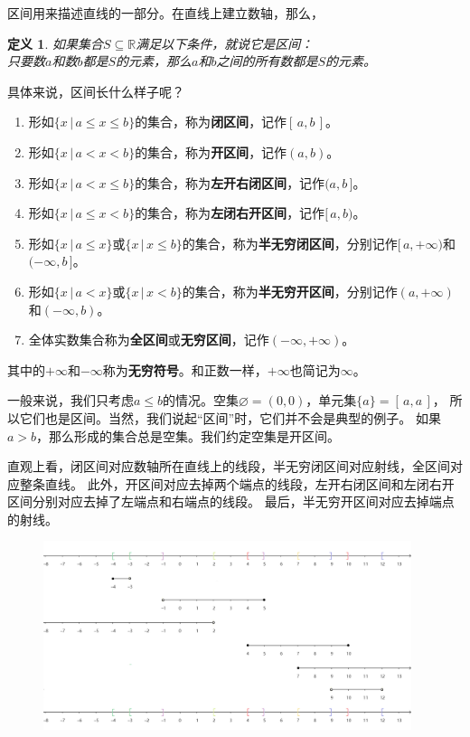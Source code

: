 \documentclass[12pt,UTF8]{ctexbook}
\newtheorem{df}{定义}[section]
\begin{document}
区间用来描述直线的一部分。在直线上建立数轴，那么，

\begin{df}\label{df:5-3-0}
    如果集合$S\subseteq \mathbb{R}$满足以下条件，就说它是区间：\\
    只要数$a$和数$b$都是$S$的元素，那么$a$和$b$之间的所有数都是$S$的元素。
\end{df}

具体来说，区间长什么样子呢？
\begin{enumerate}
    \item 形如$\{x \, | \, a \leqslant x \leqslant b\}$的集合，称为\textbf{闭区间}，记作$[\, a, b\,]$。
    \item 形如$\{x \, | \, a < x < b\}$的集合，称为\textbf{开区间}，记作$(a, b)$。
    \item 形如$\{x \, | \, a < x \leqslant b\}$的集合，称为\textbf{左开右闭区间}，记作$(a, b\,]$。
    \item 形如$\{x \, | \, a \leqslant x < b\}$的集合，称为\textbf{左闭右开区间}，记作$[\, a, b)$。
    \item 形如$\{x \, | \, a \leqslant x \}$或$\{x \, | \, x \leqslant b \}$的集合，称为\textbf{半无穷闭区间}，分别记作$[\, a, +\infty)$和$(-\infty, b\,]$。
    \item 形如$\{x \, | \, a < x \}$或$\{x \, | \, x < b \}$的集合，称为\textbf{半无穷开区间}，分别记作$(a, +\infty)$和$(-\infty, b)$。
    \item 全体实数集合称为\textbf{全区间}或\textbf{无穷区间}，记作$(-\infty, +\infty)$。
\end{enumerate}
其中的$+\infty$和$-\infty$称为\textbf{无穷符号}。和正数一样，$+\infty$也简记为$\infty$。

一般来说，我们只考虑$a \leqslant b$的情况。空集$\varnothing = (0, 0)$，单元集$\{a\} = [\, a, a\,]$，
所以它们也是区间。当然，我们说起“区间”时，它们并不会是典型的例子。
如果$a > b$，那么形成的集合总是空集。我们约定空集是开区间。

直观上看，闭区间对应数轴所在直线上的线段，半无穷闭区间对应射线，全区间对应整条直线。
此外，开区间对应去掉两个端点的线段，左开右闭区间和左闭右开区间分别对应去掉了左端点和右端点的线段。
最后，半无穷开区间对应去掉端点的射线。

\begin{figure}[H] %
    \vspace{8pt}
    \includegraphics[width=0.96\textwidth]{tu/区间1.png}
\end{figure}
\end{document}
